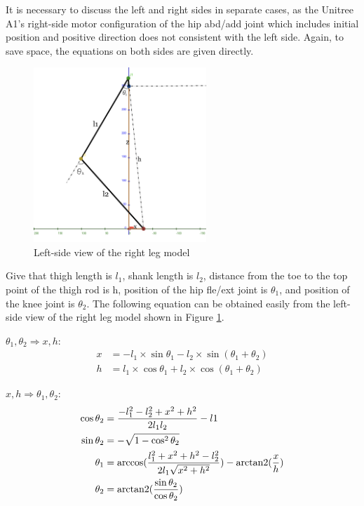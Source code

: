 It is necessary to discuss the left and right sides in separate cases, as the Unitree A1's right-side motor configuration of the hip abd/add joint which includes initial position and positive direction does not consistent with the left side. Again, to save space, the equations on both sides are given directly.

\begin{figure}[htbp]\label{fig:right_leg_model_left-side_view}
   \centering
   \includegraphics[width=0.58\textwidth]{figures/right_leg_model_left-side_view.jpg}
   \caption{Left-side view of the right leg model}
\end{figure}

Give that thigh length is $l_1$, shank length is $l_2$, distance from the toe to the top point of the thigh rod is h, position of the hip fle/ext joint is $\theta_1$, and position of the knee joint is $\theta_2$. The following equation can be obtained easily from the left-side view of the right leg model shown in Figure \ref{fig:right_leg_model_left-side_view}.

$\theta_1, \theta_2 \Rightarrow x, h$:
\begin{align*}
x &= -l_1 \times \sin\theta_1 - l_2 \times \sin(\theta_1 + \theta_2) \\
h &=  l_1 \times \cos\theta_1 + l_2 \times \cos(\theta_1 + \theta_2)
\end{align*}

$x, h \Rightarrow \theta_1, \theta_2$:
\begin{align*}
\cos\theta_2 &= \frac{-l_1^2 - l_2^2 + x^2 + h^2}{2 l_1 l_2} -l1 \\
\sin\theta_2 &= -\sqrt{1 - \cos^2\theta_2} \\
\theta_1 &= \arccos(\frac{l_1^2 + x^2 + h^2 - l_2^2}{2 l_1 \sqrt{x^2 + h^2}}) - \operatorname{arctan2}(\frac{x}{h}) \\
\theta_2 &= \operatorname{arctan2}(\frac{\sin\theta_2}{\cos\theta_2})
\end{align*}

